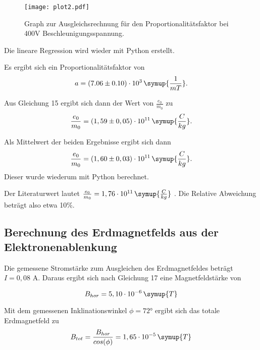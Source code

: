 \begin{figure}[H]
  \centering
  \texttt{[image: plot2.pdf]}
  \caption{Graph zur Ausgleichsrechnung für den Proportionalitätsfaktor bei 400V Beschleunigungsspannung.}
  \label{fig:plot222}
\end{figure}

Die lineare Regression wird wieder mit Python erstellt.

Es ergibt sich ein Proportionalitätsfaktor von
\begin{equation*}
  a = (7.06 \pm 0.10)\cdot 10^3\, \symup{\frac{1}{mT}}.
\end{equation*}

Aus Gleichung 15 ergibt sich dann der Wert von $\frac{e_0}{m_0}$ zu
\begin{equation*}
  \frac{e_0}{m_0} = (1,59 \pm 0,05)\cdot 10^{11} \, \symup{\frac{C}{kg}}.
\end{equation*}

Als Mittelwert der beiden Ergebnisse ergibt sich dann
\begin{equation*}
  \frac{e_0}{m_0} = (1,60 \pm 0,03)\cdot 10^{11} \, \symup{\frac{C}{kg}}.
\end{equation*}
Dieser wurde wiederum mit Python berechnet.

Der Literaturwert lautet $\frac{e_0}{m_0} = 1,76 \cdot 10^{11} \, \symup{\frac{C}{kg}}$ \cite{sample1}.
Die Relative Abweichung beträgt also etwa 10\%.

\subsection{Berechnung des Erdmagnetfelds aus der Elektronenablenkung}

Die gemessene Stromstärke zum Ausgleichen des Erdmagnetfeldes beträgt $I = 0,08$ A.
Daraus ergibt sich nach Gleichung 17 eine Magnetfeldstärke von

\begin{equation*}
  B_{hor} = 5,10 \cdot 10^{-6} \, \symup{T}
\end{equation*}

Mit dem gemessenen Inklinationswinkel $\phi = 72°$ ergibt sich das totale
Erdmagnetfeld zu
\begin{equation*}
  B_{tot} = \frac{B_{hor}}{cos(\phi)} = 1,65 \cdot 10^{-5} \, \symup{T}
\end{equation*}
